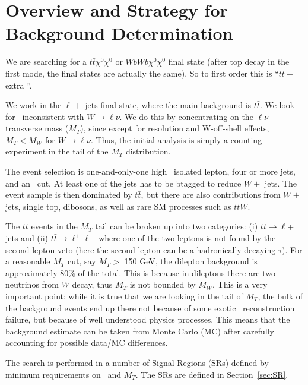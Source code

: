 \section{Overview and Strategy for Background Determination}
\label{sec:overview}

We are searching for a $t\bar{t}\chi^0\chi^0$ or $W b W \bar{b} \chi^0 \chi^0$ final state
(after top decay in the first mode, the final states are actually the same).  So to first order 
this is ``$t\bar{t} +$ extra \met''.  

We work in the $\ell +$ jets final state, where the main background is $t\bar{t}$.  We look for 
\met\ inconsistent with $W \to \ell \nu$.  We do this by concentrating on the $\ell \nu$ transverse
mass ($M_T$), since except for resolution and W-off-shell effects, $M_T < M_W$ for $W \to \ell \nu$.  Thus, the
initial analysis is simply a counting experiment in the tail of the $M_T$ distribution.  

The event selection is one-and-only-one high \pt\ isolated lepton, four or more jets, and
an \met\ cut.  At least one of the jets has to be btagged to reduce $W+$ jets.
The event sample is then dominated by $t\bar{t}$, but there are also contributions from $W+$ jets,
single top, dibosons, as well as rare SM processes such as $ttW$.


The $t\bar{t}$ events in the $M_T$ tail can be broken up into two categories: 
(i) $t\bar{t} \to \ell $+ jets and (ii) $t\bar{t} \to \ell^+ \ell^-$ where one of the two
leptons is not found by the second-lepton-veto (here the second lepton can be a hadronically
decaying $\tau$).
 For a reasonable $M_T$ cut, say $M_T >$ 150 GeV, the dilepton background is approximately 80\% of 
the total.  This is because in dileptons there are two neutrinos from $W$ decay, thus $M_T$
is not bounded by $M_W$.  This is a very important point: while it is true that we are looking in
the tail of $M_T$, the bulk of the background events end up there not because of some exotic
\met\ reconstruction failure, but because of well understood physics processes.  This means that 
the background estimate can be taken from Monte Carlo (MC) 
after carefully accounting for possible
data/MC differences.   

The search is performed in a number of Signal Regions (SRs) defined 
by minimum requirements on \met\  and $M_T$.  The SRs
are defined in Section~\ref{sec:SR}.

